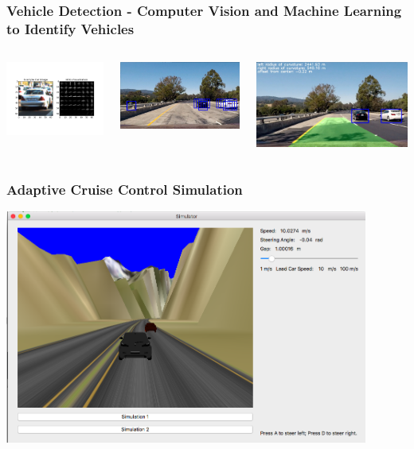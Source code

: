\documentclass[mathserif]{beamer}
\begin{document}
\begin{frame}
\frametitle{Vehicle Detection - Computer Vision and Machine Learning to Identify Vehicles}

\begin{columns}[c]
\column{1.5in}
\includegraphics[width=45mm]{vd1.png}

\includegraphics[width=5.5cm]{vd2.jpg}

\column{3in}
\begin{center}
\includegraphics[width=7cm]{vd3.jpg}

\vspace{0.1cm}
\begin{columns}[c]
\column{1.5in}

\end{columns}
\end{center}
\end{columns}

\end{frame}
\begin{frame}
\frametitle{Adaptive Cruise Control Simulation}

\includegraphics[width=4.7in]{SimulatorScreenShot.png}


\end{frame}
\end{document}
